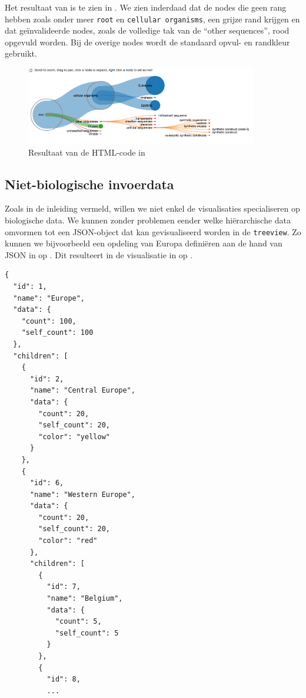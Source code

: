 Het resultaat van  is te zien in 
. We zien inderdaad dat de nodes die geen rang hebben 
zoals onder meer \texttt{root} en \texttt{cellular organisms}, een 
grijze rand krijgen en dat geïnvalideerde nodes, zoals de volledige tak van de 
``other sequences'', rood opgevuld worden. Bij de overige nodes wordt de 
standaard opvul- en randkleur gebruikt.

\begin{figure}
    \centering
    \includegraphics[width=0.9\textwidth]{includes/visexample3}
    \caption{Resultaat van de HTML-code in }
    \label{fig:visexample3}
\end{figure}

\subsection{Niet-biologische invoerdata}
Zoals in de inleiding vermeld, willen we niet enkel de visualisaties 
specialiseren op biologische data. We kunnen zonder problemen eender welke 
hiërarchische data omvormen tot een JSON-object dat kan gevisualiseerd worden  
in de \texttt{treeview}. Zo kunnen we bijvoorbeeld een opdeling van Europa 
definiëren aan de hand van JSON in  op 
. Dit resulteert in de visualisatie in 
 op .

\begin{lstlisting}[caption={JSON-representatie van een opdeling van Europa als 
invoer voor de \texttt{treeview}-visualisatie.}, 
label={lst:visexample4}, float]
{
  "id": 1,
  "name": "Europe",
  "data": {
    "count": 100,
    "self_count": 100
  },
  "children": [
    {
      "id": 2,
      "name": "Central Europe",
      "data": {
        "count": 20,
        "self_count": 20,
        "color": "yellow"
      }
    },
    {
      "id": 6,
      "name": "Western Europe",
      "data": {
        "count": 20,
        "self_count": 20,
        "color": "red"
      },
      "children": [
        {
          "id": 7,
          "name": "Belgium",
          "data": {
            "count": 5,
            "self_count": 5
          }
        },
        {
          "id": 8,
          ...
\end{lstlisting}

